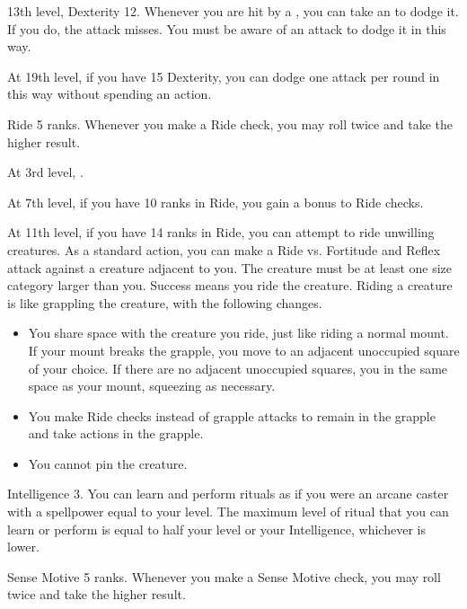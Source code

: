     \featpres 13th level, Dexterity 12.
    \featben Whenever you are hit by a , you can take an  to dodge it.
    If you do, the attack misses.
    You must be aware of an attack to dodge it in this way.

    At 19th level, if you have 15 Dexterity, you can dodge one attack per round in this way without spending an action.

    \featpre Ride 5 ranks.
    \featben Whenever you make a Ride check, you may roll twice and take the higher result.

    At 3rd level, \tdash.

    At 7th level, if you have 10 ranks in Ride, you gain a  bonus to Ride checks.

    At 11th level, if you have 14 ranks in Ride, you can attempt to ride unwilling creatures.
    As a standard action, you can make a Ride vs. Fortitude and Reflex attack against a creature adjacent to you.
    The creature must be at least one size category larger than you.
    Success means you ride the creature.
    Riding a creature is like grappling the creature, with the following changes.
    \begin{itemize}
        \item You share space with the creature you ride, just like riding a normal mount.
            If your mount breaks the grapple, you move to an adjacent unoccupied square of your choice.
            If there are no adjacent unoccupied squares, you in the same space as your mount, squeezing as necessary.
        \item You make Ride checks instead of grapple attacks to remain in the grapple and take actions in the grapple.
        \item You cannot pin the creature.
    \end{itemize}

    \featpre Intelligence 3.
    \featben You can learn and perform rituals as if you were an arcane caster with a spellpower equal to your level.
    The maximum level of ritual that you can learn or perform is equal to half your level or your Intelligence, whichever is lower.

    \featpre Sense Motive 5 ranks.
    \featben Whenever you make a Sense Motive check, you may roll twice and take the higher result.

